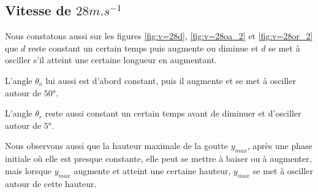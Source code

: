 \documentclass[french]{article}
\begin{document}
\subsection{Vitesse de $28m.s^{-1}$}
Nous constatons aussi sur les figures \ref{fig:v=28d}, \ref{fig:v=28oa_2} et \ref{fig:v=28or_2} que $d$ reste constant un certain temps puis augmente ou diminue et $d$ se met à osciller s'il atteint une certaine longueur en augmentant.

L'angle $\theta_{a}$ lui aussi est d'abord constant, puis il augmente et se met à osciller autour de $\ang{50}$.

L'angle $\theta_{r}$ reste aussi constant un certain temps avant de diminuer et d'osciller autour de $\ang{5}$.

Nous observons aussi que la hauteur maximale de la goutte $y_{max}$, après une phase initiale où elle est presque constante, elle peut se mettre à baiser ou à augmenter, mais lorsque $y_{max}$ augmente et atteint une certaine hauteur, $y_{max}$ se met à osciller autour de cette hauteur.
\end{document}
